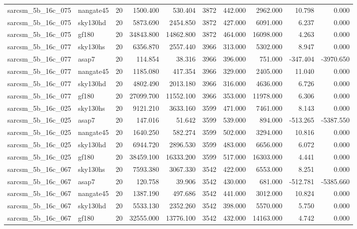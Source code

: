 \documentclass{article}
\begin{document}
\begin{longtable}{llrrrrrrrr}
sarcsm\_5b\_16c\_075 & nangate45 & 20 & 1500.400 & 530.404 & 3872 & 442.000 & 2962.000 & 10.798 & 0.000 \\
sarcsm\_5b\_16c\_075 & sky130hd & 20 & 5873.690 & 2454.850 & 3872 & 427.000 & 6091.000 & 6.237 & 0.000 \\
sarcsm\_5b\_16c\_075 & gf180 & 20 & 34843.800 & 14862.800 & 3872 & 464.000 & 16098.000 & 4.263 & 0.000 \\
sarcsm\_5b\_16c\_077 & sky130hs & 20 & 6356.870 & 2557.440 & 3966 & 313.000 & 5302.000 & 8.947 & 0.000 \\
sarcsm\_5b\_16c\_077 & asap7 & 20 & 114.854 & 38.316 & 3966 & 396.000 & 751.000 & -347.404 & -3970.650 \\
sarcsm\_5b\_16c\_077 & nangate45 & 20 & 1185.080 & 417.354 & 3966 & 329.000 & 2405.000 & 11.040 & 0.000 \\
sarcsm\_5b\_16c\_077 & sky130hd & 20 & 4802.490 & 2013.180 & 3966 & 316.000 & 4636.000 & 6.726 & 0.000 \\
sarcsm\_5b\_16c\_077 & gf180 & 20 & 27099.700 & 11552.100 & 3966 & 353.000 & 11978.000 & 6.306 & 0.000 \\
sarcsm\_5b\_16c\_025 & sky130hs & 20 & 9121.210 & 3633.160 & 3599 & 471.000 & 7461.000 & 8.143 & 0.000 \\
sarcsm\_5b\_16c\_025 & asap7 & 20 & 147.016 & 51.642 & 3599 & 539.000 & 894.000 & -513.265 & -5387.550 \\
sarcsm\_5b\_16c\_025 & nangate45 & 20 & 1640.250 & 582.274 & 3599 & 502.000 & 3294.000 & 10.816 & 0.000 \\
sarcsm\_5b\_16c\_025 & sky130hd & 20 & 6944.720 & 2896.530 & 3599 & 483.000 & 6656.000 & 6.072 & 0.000 \\
sarcsm\_5b\_16c\_025 & gf180 & 20 & 38459.100 & 16333.200 & 3599 & 517.000 & 16303.000 & 4.441 & 0.000 \\
sarcsm\_5b\_16c\_067 & sky130hs & 20 & 7593.380 & 3067.330 & 3542 & 422.000 & 6553.000 & 8.251 & 0.000 \\
sarcsm\_5b\_16c\_067 & asap7 & 20 & 120.758 & 39.906 & 3542 & 430.000 & 681.000 & -512.781 & -5385.660 \\
sarcsm\_5b\_16c\_067 & nangate45 & 20 & 1387.190 & 497.686 & 3542 & 441.000 & 3012.000 & 10.824 & 0.000 \\
sarcsm\_5b\_16c\_067 & sky130hd & 20 & 5533.130 & 2352.260 & 3542 & 398.000 & 5570.000 & 5.750 & 0.000 \\
sarcsm\_5b\_16c\_067 & gf180 & 20 & 32555.000 & 13776.100 & 3542 & 432.000 & 14163.000 & 4.742 & 0.000 \\

\end{longtable}
\end{document}
